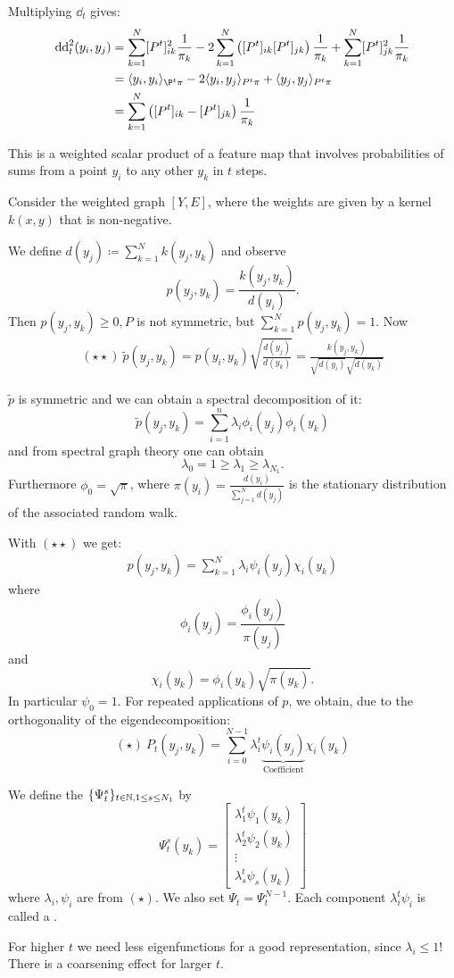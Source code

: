 Multiplying $\dd_t$ gives:
\begin{align*}
    \dd_t^2(y_i,y_j)&= \sum_{k=1}^N[P^t]_{ik}^2\frac{1}{\pi_k}-2\sum_{k=1}^N \left([P^t]_{ik}[P^t]_{jk}\right)\frac{1}{\pi_k}+\sum_{k=1}^N [P^t]_{jk}^2\frac{1}{\pi_k}\\
    &=\langle y_i,y_i\rangle_{\P^t\pi}-2\langle y_i,y_j\rangle_{P^t\pi}+\langle y_j,y_j\rangle_{P^t\pi}\\
    &=\sum_{k=1}^N\left([P^t]_{ik}-[P^t]_{jk}\right)\frac{1}{\pi_k}
\end{align*}

This is a weighted scalar product of a feature map that involves probabilities of sums from a point $y_i$ to any other $y_k$ in $t$ steps.

Consider the weighted graph $[Y,E]$, where the weights are given by a kernel 
$k(x,y)$
that is non-negative. 

We define $d(y_j)\coloneqq \sum_{k=1}^N k(y_j,y_k)$ and observe 
\[p(y_j,y_k)=\frac{k(y_j,y_k)}{d(y_i)}.\]
Then $p(y_j,y_k)\geq 0, P$ is not symmetric, but $\sum_{k=1}^N p(y_j,y_k)=1$. Now 
\begin{align*}
    (\star\star)\ \tilde{p}(y_j,y_k)=p(y_i,y_k)\sqrt{\frac{d(y_j)}{d(y_k)}}=\frac{k(y_j,y_k)}{\sqrt{d(y_i)}\sqrt{d(y_k)}}
\end{align*}

$\tilde{p}$ is symmetric and we can obtain a spectral decomposition of it:
\[\tilde{p}(y_j,y_k)=\sum_{i=1}^n\lambda_i\phi_i(y_j)\phi_i(y_k)\]
and from spectral graph theory one can obtain
\[\lambda_0=1\geq \lambda_1\geq \lambda_{N_1}.\]
Furthermore $\phi_0=\sqrt{\pi}$, where $\pi(y_i)=\frac{d(y_i)}{\sum_{j=1}^N d(y_j)}$
is the stationary distribution of the associated random walk.

With $(\star\star)$ we get:
\begin{align*}
    p(y_j,y_k)=\sum_{k=1}^N\lambda_i\psi_i(y_j)\chi_i(y_k)
\end{align*}
where 
\[\phi_i(y_j)=\frac{\phi_i(y_j)}{\pi(y_j)}\]
and 
\[\chi_i(y_k)=\phi_i(y_k)\sqrt{\pi(y_k)}.\]
In particular $\psi_0=1$. For repeated applications of $p$, we obtain, due to the orthogonality of the eigendecomposition:
\[(\star)\ P_t(y_j,y_k)=\sum_{i=0}^{N-1}\lambda_i^t\underbrace{\psi_i(y_j)}_{\text{Coefficient}}\chi_i(y_k)\]

\begin{definition}\label{def:2.27}
    We define the  $\{\Psi_t^s\}_{t\in\mathbb{N},1\leq s\leq N_1}$ by 
    \[\Psi_t^s(y_k)=\begin{bmatrix}
        \lambda_1^t\psi_1(y_k)\\
        \lambda_2^t\psi_2(y_k)\\
        \vdots\\
        \lambda_s^t\psi_s(y_k)
    \end{bmatrix}\]
    where $\lambda_i,\psi_i$ are from $(\star)$. We also set $\Psi_t=\Psi_t^{N-1}$. Each component 
    $\lambda_i^t\psi_i$ is called a .
\end{definition}

\begin{aremark}
    For higher $t$ we need less eigenfunctions for a good representation, since $\lambda_i\leq 1$!
    There is a coarsening effect for larger $t$.
\end{aremark}



